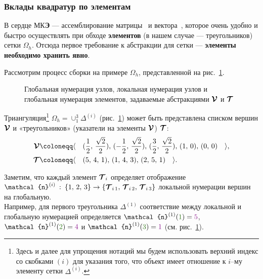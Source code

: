 \subsubsection{Вклады квадратур по элементам}
\label{elementAssembly}

В сердце МК\textbf{Э} --- ассемблирование матрицы~ и вектора~, которое очень удобно и быстро осуществлять при обходе \textbf{элементов} (в нашем случае --- треугольников) сетки $\Omega_h$. Отсюда первое требование к абстракции для сетки --- \textbf{элементы необходимо хранить явно}.

Рассмотрим процесс сборки на примере $\Omega_h$, представленной на рис.~\ref{fig:assemblyMesh}.

\begin{figure}[!h]
	\centering
	\resizebox{0.8\textwidth}{!}{}
	\caption{{\color{Plum} Глобальная нумерация узлов}, {\color{OliveGreen} локальная нумерация узлов} и глобальная нумерация элементов, задаваемые абстракциями $\boldsymbol{\mathbf{\mathcal{V}}}$ и $\boldsymbol{\mathbf{\mathcal{T}}}$}
	\label{fig:assemblyMesh}
\end{figure}

Триангуляция\footnote{
	Здесь и далее для упрощения нотаций мы будем использовать верхний индекс со скобками $(i)$ для указания того, что объект имеет отношение к $i$--му элементу сетки $\Delta^{(i)}$.
} $\Omega_h = \cup_1^3 \Delta^{(i)}$ (рис.~\ref{fig:assemblyMesh}) может быть представлена списком вершин $\boldsymbol{\mathbf{\mathcal{V}}}$ и «треугольников» (указатели на элементы $\boldsymbol{\mathbf{\mathcal{V}}}$) $\boldsymbol{\mathbf{\mathcal{T}}}$:
\begin{align*}
	\vect{\mathcal{V}} &\coloneqq \langle \quad
		( \frac{1}{2}, \, \frac{\sqrt{2}}{2} ), \,
		( -\frac{1}{2}, \, \frac{\sqrt{2}}{2} ), \,
		( \frac{3}{2}, \, \frac{\sqrt{2}}{2} ), \,
		(1, \, 0), \,
		(0, \, 0)
	\quad \rangle, \\
	\vect{\mathcal{T}} &\coloneqq \langle \quad
	( 5, \, 4, \, 1 ), \,
	( 1, \, 4, \, 3 ), \,
	( 2, \, 5, \, 1 )
	\quad \rangle.
\end{align*}

Заметим, что каждый элемент $\boldsymbol{\mathbf{\mathcal{T}}}_i$ определяет отображение $\vect{\mathcal{n}}^{(i)} \: : \: \{ 1, \, 2, \, 3 \} \rightarrow \{ \vect{\mathcal{T}}_{i \, 1}, \, \vect{\mathcal{T}}_{i \, 2}, \, \vect{\mathcal{T}}_{i \, 3} \}$ {\color{OliveGreen} локальной} нумерации вершин на {\color{Plum} глобальную}. \\
Например, для первого треугольника $\Delta^{(1)}$ соответствие между {\color{OliveGreen} локальной} и {\color{Plum} глобальную} нумерацией определяется $\vect{\mathcal{n}}^{(1)}({\color{OliveGreen} 1}) = {\color{Plum} 5}$, $\vect{\mathcal{n}}^{(1)}({\color{OliveGreen} 2}) = {\color{Plum} 4}$ и $\vect{\mathcal{n}}^{(1)}({\color{OliveGreen} 3}) = {\color{Plum} 1}$ (см. рис.~\ref{fig:assemblyMesh}).


